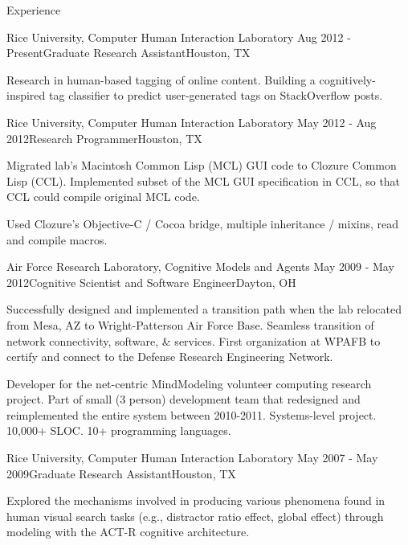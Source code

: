 
\begin{rSection}{Experience}

\begin{rSubsection}{Rice University, Computer Human Interaction Laboratory}
  {Aug 2012 - Present}{Graduate Research Assistant}{Houston, TX}
\item Research in human-based tagging of online content.
  Building a cognitively-inspired tag classifier to predict user-generated tags on StackOverflow posts.
\end{rSubsection}

\begin{rSubsection}{Rice University, Computer Human Interaction Laboratory}
  {May 2012 - Aug 2012}{Research Programmer}{Houston, TX}
\item Migrated lab's Macintosh Common Lisp (MCL) GUI code to Clozure Common Lisp (CCL).
  Implemented subset of the MCL GUI specification in CCL, so that CCL could compile original MCL code.
\item Used Clozure's Objective-C / Cocoa bridge, multiple inheritance / mixins, read and compile macros.
\end{rSubsection}

\begin{rSubsection}{Air Force Research Laboratory, Cognitive Models and Agents}
  {May 2009 - May 2012}{Cognitive Scientist and Software Engineer}{Dayton, OH}
\item Successfully designed and implemented a transition path when the lab relocated from Mesa, AZ to Wright-Patterson Air Force Base. 
Seamless transition of network connectivity, software, \& services.
First organization at WPAFB to certify and connect to the Defense Research Engineering Network.
\item Developer for the net-centric MindModeling volunteer computing research project.
Part of small (3 person) development team that redesigned and reimplemented the entire system between 2010-2011.
Systems-level project. 10,000+ SLOC. 10+ programming languages.
\end{rSubsection}

\begin{rSubsection}{Rice University, Computer Human Interaction Laboratory}
  {May 2007 - May 2009}{Graduate Research Assistant}{Houston, TX}
\item Explored the mechanisms involved in producing various phenomena found in human visual search tasks
(e.g., distractor ratio effect, global effect) through modeling with the ACT-R cognitive architecture. 
\end{rSubsection}


\end{rSection}
